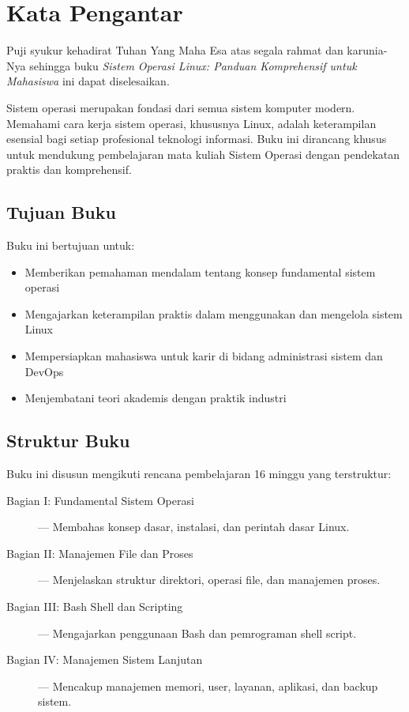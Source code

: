 
\chapter*{Kata Pengantar}

Puji syukur kehadirat Tuhan Yang Maha Esa atas segala rahmat dan karunia-Nya
sehingga buku \textit{Sistem Operasi Linux: Panduan Komprehensif untuk Mahasiswa}
ini dapat diselesaikan.

Sistem operasi merupakan fondasi dari semua sistem komputer modern. Memahami
cara kerja sistem operasi, khususnya Linux, adalah keterampilan esensial bagi
setiap profesional teknologi informasi. Buku ini dirancang khusus untuk mendukung
pembelajaran mata kuliah Sistem Operasi dengan pendekatan praktis dan komprehensif.

\section*{Tujuan Buku}

Buku ini bertujuan untuk:

\begin{itemize}
    \item Memberikan pemahaman mendalam tentang konsep fundamental sistem operasi
    \item Mengajarkan keterampilan praktis dalam menggunakan dan mengelola sistem Linux
    \item Mempersiapkan mahasiswa untuk karir di bidang administrasi sistem dan DevOps
    \item Menjembatani teori akademis dengan praktik industri
\end{itemize}

\section*{Struktur Buku}

Buku ini disusun mengikuti rencana pembelajaran 16 minggu yang terstruktur:

\begin{description}
    \item[Bagian I: Fundamental Sistem Operasi] --- Membahas konsep dasar, instalasi,
          dan perintah dasar Linux.
    \item[Bagian II: Manajemen File dan Proses] --- Menjelaskan struktur direktori,
          operasi file, dan manajemen proses.
    \item[Bagian III: Bash Shell dan Scripting] --- Mengajarkan penggunaan Bash
          dan pemrograman shell script.
    \item[Bagian IV: Manajemen Sistem Lanjutan] --- Mencakup manajemen memori, user,
          layanan, aplikasi, dan backup sistem.
\end{description}

